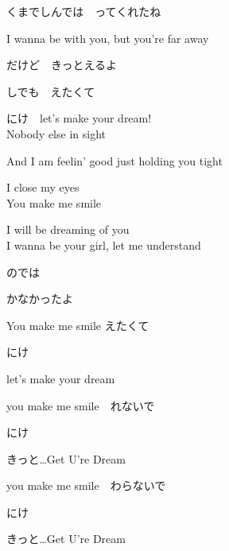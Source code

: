 {くまでしんでは　ってくれたね

I wanna be with you, but you're far away

だけど　きっとえるよ

しでも　えたくて

にけ　let's make your dream!
\\

Nobody else in sight

And I am feelin' good just holding you tight

I close my eyes
\\

You make me smile

I will be dreaming of you
\\

I wanna be your girl, let me understand

のでは

かなかったよ

You make me smile えたくて

にけ

let's make your dream

you make me smile　れないで

にけ

きっと…Get U're Dream

you make me smile　わらないで

にけ

きっと…Get U're Dream

}